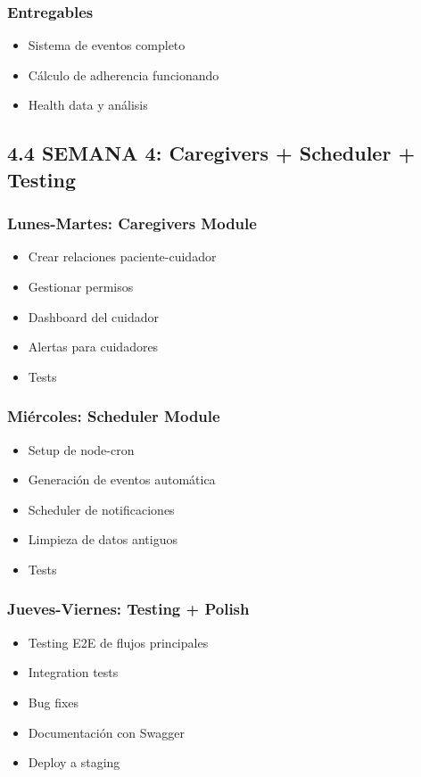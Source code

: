 \documentclass[12pt,a4paper]{article}
\begin{document}
\subsubsection{Entregables}
\begin{itemize}
    \item Sistema de eventos completo
    \item Cálculo de adherencia funcionando
    \item Health data y análisis
\end{itemize}

\subsection{4.4 SEMANA 4: Caregivers + Scheduler + Testing}

\subsubsection{Lunes-Martes: Caregivers Module}
\begin{itemize}
    \item Crear relaciones paciente-cuidador
    \item Gestionar permisos
    \item Dashboard del cuidador
    \item Alertas para cuidadores
    \item Tests
\end{itemize}

\subsubsection{Miércoles: Scheduler Module}
\begin{itemize}
    \item Setup de node-cron
    \item Generación de eventos automática
    \item Scheduler de notificaciones
    \item Limpieza de datos antiguos
    \item Tests
\end{itemize}

\subsubsection{Jueves-Viernes: Testing + Polish}
\begin{itemize}
    \item Testing E2E de flujos principales
    \item Integration tests
    \item Bug fixes
    \item Documentación con Swagger
    \item Deploy a staging
\end{itemize}
\end{document}
